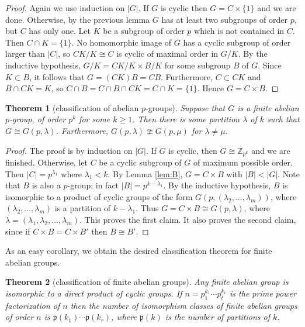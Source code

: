 \documentclass[11pt,oneside]{article}
\newtheorem{thm}{Theorem}[section]
\theoremstyle{definition}
\newcommand{\Z}{\mathbb{Z}} %
\newcommand{\ptn}{\mathfrak{p}}
\begin{document}
\begin{proof}
Again we use induction on $|G|$. If $G$ is cyclic then $G = C \times
\{1\}$ and we are done. Otherwise, by the previous lemma $G$ has at
least two subgroups of order $p$, but $C$ has only one. Let $K$ be a
subgroup of order $p$ which is not contained in $C$. Then $C \cap K =
\{1\}$. No homomorphic image of $G$ has a cyclic subgroup of order
larger than $|C|$, so $CK/K \cong C$ is cyclic of maximal order in
$G/K$. By the inductive hypothesis, $G/K = CK/K \times B/K$ for some
subgroup $B$ of $G$. Since $K \subset B$, it follows that $G = (CK)B =
CB$.  Furthermore, $C \subset CK$ and $B \cap CK = K$, so $C \cap B =
C \cap B \cap CK = C \cap K = \{1\}$. Hence $G = C \times B$.
\end{proof}






\begin{thm}[classification of abelian $p$-groups]
\label{thm:abelian-p}%
  Suppose that $G$ is a finite abelian $p$-group, of order $p^k$ for
  some $k \ge 1$. Then there is some partition $\lambda$ of $k$ such
  that $G \cong G(p,\lambda)$. Furthermore, $G(p,\lambda) \ncong
  G(p,\mu)$ for $\lambda \ne \mu$.
\end{thm}

\begin{proof}
The proof is by induction on $|G|$.  If $G$ is cyclic, then $G \cong
\Z_{p^k}$ and we are finished. Otherwise, let $C$ be a cyclic subgroup
of $G$ of maximum possible order. Then $|C| = p^{\lambda_1}$ where
$\lambda_1 < k$. By Lemma \ref{lem:B}, $G = C \times B$ with $|B| <
|G|$. Note that $B$ is also a $p$-group; in fact $|B| =
p^{k-\lambda_1}$. By the inductive hypothesis, $B$ is isomorphic to a
product of cyclic groups of the form $G(p, (\lambda_2, \dots,
\lambda_m))$, where $(\lambda_2, \dots, \lambda_m)$ is a partition of
$k-\lambda_1$. Thus $G = C \times B \cong G(p,\lambda)$, where
$\lambda = (\lambda_1, \lambda_2, \dots, \lambda_m)$. This proves the
first claim.  It also proves the second claim, since if $C \times B =
C \times B'$ then $B \cong B'$. 
\end{proof}


As an easy corollary, we obtain the desired classification theorem for
finite abelian groups.

\begin{thm}[classification of finite abelian groups]
%
  Any finite abelian group is isomorphic to a direct product of cyclic
  groups. If $n = p_1^{k_1} \cdots p_t^{k_r}$ is the prime power
  factorization of $n$ then the number of isomorphism classes of
  finite abelian groups of order $n$ is $\ptn(k_1) \cdots \ptn(k_r)$,
  where $\ptn(k)$ is the number of partitions of $k$.
\end{thm}
\end{document}
